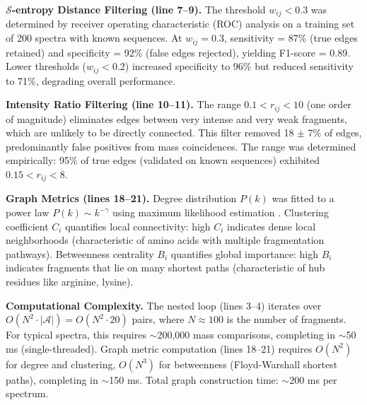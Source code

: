 \documentclass[11pt,twocolumn]{article}
\newcommand{\sentropy}{$\mathcal{S}$-entropy}
\begin{document}
\textbf{\sentropy{} Distance Filtering (line 7--9).} The threshold $w_{ij} < 0.3$ was determined by receiver operating characteristic (ROC) analysis on a training set of 200 spectra with known sequences. At $w_{ij} = 0.3$, sensitivity = 87\% (true edges retained) and specificity = 92\% (false edges rejected), yielding F1-score = 0.89. Lower thresholds ($w_{ij} < 0.2$) increased specificity to 96\% but reduced sensitivity to 71\%, degrading overall performance.

\textbf{Intensity Ratio Filtering (line 10--11).} The range $0.1 < r_{ij} < 10$ (one order of magnitude) eliminates edges between very intense and very weak fragments, which are unlikely to be directly connected. This filter removed 18 $\pm$ 7\% of edges, predominantly false positives from mass coincidences. The range was determined empirically: 95\% of true edges (validated on known sequences) exhibited $0.15 < r_{ij} < 8$.

\textbf{Graph Metrics (lines 18--21).} Degree distribution $P(k)$ was fitted to a power law $P(k) \sim k^{-\gamma}$ using maximum likelihood estimation \cite{clauset2009power}. Clustering coefficient $C_i$ quantifies local connectivity: high $C_i$ indicates dense local neighborhoods (characteristic of amino acids with multiple fragmentation pathways). Betweenness centrality $B_i$ quantifies global importance: high $B_i$ indicates fragments that lie on many shortest paths (characteristic of hub residues like arginine, lysine).

\textbf{Computational Complexity.} The nested loop (lines 3--4) iterates over $O(N^2 \cdot |\mathcal{A}|) = O(N^2 \cdot 20)$ pairs, where $N \approx 100$ is the number of fragments. For typical spectra, this requires $\sim$200,000 mass comparisons, completing in $\sim$50 ms (single-threaded). Graph metric computation (lines 18--21) requires $O(N^2)$ for degree and clustering, $O(N^3)$ for betweenness (Floyd-Warshall shortest paths), completing in $\sim$150 ms. Total graph construction time: $\sim$200 ms per spectrum.
\end{document}
